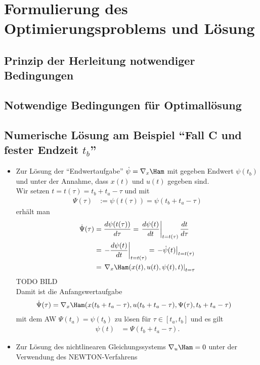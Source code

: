 \section{Formulierung des Optimierungsproblems und Lösung}

\subsection{Prinzip der Herleitung notwendiger Bedingungen}

\subsection{Notwendige Bedingungen für Optimallösung}

\subsection{Numerische Lösung am Beispiel "`Fall C und fester Endzeit $t_b$"'}
\begin{itemize}
  \item Zur Lösung der "`Endwertaufgabe"' $\dot{\psi}=\nabla_x \Ham$ mit gegeben Endwert $\psi(t_b)$ und unter der Annahme, dass $x(t)$ und $u(t)$ gegeben sind.\\
  		Wir setzen $t=t(\tau)=t_b+t_a-\tau$ und mit 
  		\begin{align*}
  			\Psi(\tau) & := \psi(t(\tau)) = \psi(t_b+t_a-\tau)
  		\end{align*}
  		erhält man 
  		\begin{align*}
  			\dot{\Psi}(\tau) & = \frac{d\psi(t(\tau))}{d\tau} = \left.\frac{d\psi(t)}{dt}\right|_{t=t(\tau)}\frac{dt}{d\tau}\\
  			& = \left.-\frac{d\psi(t)}{dt}\right|_{t=t(\tau)}=\left.-\dot{\psi}(t)\right|_{t=t(\tau)}\\
  			& = \left.\nabla_x \Ham(x(t),u(t),\psi(t),t)\right|_{t=\tau}
  		\end{align*}
  		TODO BILD\\
  		Damit ist die Anfangswertaufgabe 
  		\begin{align*}
  			\dot{\Psi}(\tau) & = \nabla_x \Ham(x(t_b+t_a-\tau),u(t_b+t_a-\tau),\Psi(\tau),t_b+t_a-\tau)
  		\end{align*}
  		mit dem \ac{AW} $\Psi(t_a)=\psi(t_b)$ zu lösen für $\tau\in[t_a,t_b]$ und es gilt
  		\begin{align*}
  		\psi(t) & = \Psi(t_b+t_a-\tau).
  		\end{align*}
  \item Zur Lösung des nichtlinearen Gleichungssystems $\nabla_u \Ham =0$ unter der Verwendung des NEWTON-Verfahrens
\end{itemize}

